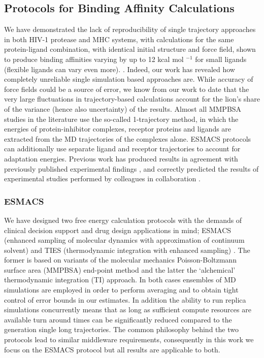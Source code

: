 
\subsection{Protocols for Binding Affinity Calculations}

We have demonstrated the lack of reproducibility of single trajectory
approaches in both HIV-1 protease and MHC systems, with calculations for the
same protein-ligand combination, with identical initial structure and force
field, shown to produce binding affinities varying by up to 12 kcal mol
$^{-1}$ for small ligands (flexible ligands can vary even more).
\cite{Wan2015, Sadiq2010, Wright2014}. Indeed, our work has revealed how
completely unreliable single simulation based approaches are. While accuracy
of force fields could be a source of error, we know from our work to date
 that the very large fluctuations in trajectory-based calculations
account for the lion’s share of the variance (hence also uncertainty) of the
results. \cite{Sadiq2010, Wan2017brd4, Bhati2017} Almost all MMPBSA studies in the literature use the so-called
1-trajectory method, in which the energies of protein-inhibitor complexes,
receptor proteins and ligands are extracted from the MD trajectories of the
complexes alone. ESMACS protocols can additionally use separate ligand and
receptor trajectories to account for adaptation energies. Previous work has
produced results in agreement with previously published experimental findings
\cite{Sadiq2010, Wan2011, Wright2014, Bhati2017, Wan2017brd4, Wan2017trk}, and
correctly predicted the results of experimental studies performed by
colleagues in collaboration \cite{Bunney2015}.


\subsubsection*{ESMACS}

We have designed two free energy calculation protocols with the demands of clinical 
decision support and drug design applications in mind; ESMACS (enhanced sampling
of molecular dynamics with approximation of continuum
solvent)\cite{Wan2017brd4} and TIES (thermodynamic integration with enhanced
sampling) \cite{Bhati2017}. The former is based on variants of the molecular
mechanics Poisson-Boltzmann surface area (MMPBSA) end-point method and the
latter the `alchemical' thermodynamic integration (TI) approach. In both cases
ensembles of MD simulations are employed in order to perform averaging and to
obtain tight control of error bounds in our estimates.
In addition the ability to run replica simulations concurrently means that as long 
as sufficient compute resources are available turn around times can be significantly 
reduced compared to the generation single long trajectories.
The common philosophy behind the two protocols lead to similar middleware requirements, 
consequently in this work we focus on the ESMACS protocol but all results are applicable 
to both.

